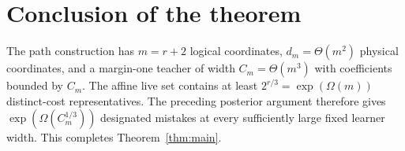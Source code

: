\documentclass[11pt]{article}
\theoremstyle{remark}\newtheorem{remark}[theorem]{Remark}
\begin{document}





\section{Conclusion of the theorem}

The path construction has $m=r+2$ logical coordinates,
$d_m=\Theta(m^2)$ physical coordinates, and a margin-one teacher of
width $C_m=\Theta(m^3)$ with coefficients bounded by $C_m$.
The affine live set contains at least $2^{r/3}=\exp(\Omega(m))$
distinct-cost representatives. The preceding posterior argument
therefore gives $\exp(\Omega(C_m^{1/3}))$ designated mistakes at
every sufficiently large fixed learner width. This completes
Theorem~\ref{thm:main}.
\end{document}
